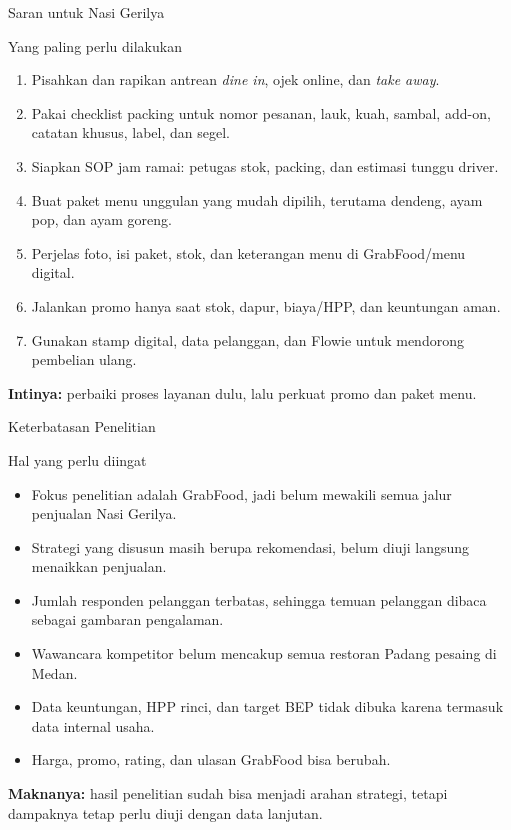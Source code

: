 \documentclass[aspectratio=169,11pt]{beamer}
\newcommand{\strong}[1]{\textbf{\textcolor{usuGreen!85!black}{#1}}}
\begin{document}
\begin{frame}{Saran untuk Nasi Gerilya}
\small
\begin{block}{Yang paling perlu dilakukan}
\begin{enumerate}
    \item Pisahkan dan rapikan antrean \textit{dine in}, ojek online, dan \textit{take away}.
    \item Pakai checklist packing untuk nomor pesanan, lauk, kuah, sambal, add-on, catatan khusus, label, dan segel.
    \item Siapkan SOP jam ramai: petugas stok, packing, dan estimasi tunggu driver.
    \item Buat paket menu unggulan yang mudah dipilih, terutama dendeng, ayam pop, dan ayam goreng.
    \item Perjelas foto, isi paket, stok, dan keterangan menu di GrabFood/menu digital.
    \item Jalankan promo hanya saat stok, dapur, biaya/HPP, dan keuntungan aman.
    \item Gunakan stamp digital, data pelanggan, dan Flowie untuk mendorong pembelian ulang.
\end{enumerate}
\end{block}
\vspace{0.1cm}
\begin{center}
\strong{Intinya:} perbaiki proses layanan dulu, lalu perkuat promo dan paket menu.
\end{center}
\end{frame}

\begin{frame}{Keterbatasan Penelitian}
\small
\begin{block}{Hal yang perlu diingat}
\begin{itemize}
    \item Fokus penelitian adalah GrabFood, jadi belum mewakili semua jalur penjualan Nasi Gerilya.
    \item Strategi yang disusun masih berupa rekomendasi, belum diuji langsung menaikkan penjualan.
    \item Jumlah responden pelanggan terbatas, sehingga temuan pelanggan dibaca sebagai gambaran pengalaman.
    \item Wawancara kompetitor belum mencakup semua restoran Padang pesaing di Medan.
    \item Data keuntungan, HPP rinci, dan target BEP tidak dibuka karena termasuk data internal usaha.
    \item Harga, promo, rating, dan ulasan GrabFood bisa berubah.
\end{itemize}
\end{block}
\vspace{0.1cm}
\begin{center}
\strong{Maknanya:} hasil penelitian sudah bisa menjadi arahan strategi, tetapi dampaknya tetap perlu diuji dengan data lanjutan.
\end{center}
\end{frame}
\end{document}

